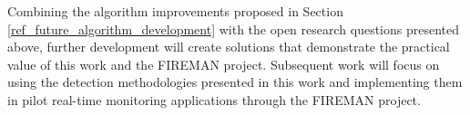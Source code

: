 Combining the algorithm improvements proposed in Section \ref{ref_future_algorithm_development} with the open research questions presented above, further development will create solutions that demonstrate the practical value of this work and the FIREMAN project. Subsequent work will focus on using the detection methodologies presented in this work and implementing them in pilot real-time monitoring applications through the FIREMAN project.